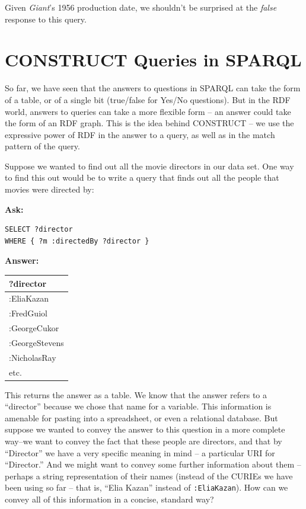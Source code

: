 Given \emph{Giant}'s 1956 production date, we shouldn't be surprised at
the \emph{false} response to this query.

\section{CONSTRUCT Queries in SPARQL}

So far, we have seen that the answers to questions in SPARQL can take
the form of a table, or of a single bit (true/false for Yes/No
questions). But in the RDF world, answers to queries can take a more
flexible form -- an answer could take the form of an RDF graph. This is
the idea behind CONSTRUCT -- we use the expressive power of RDF in the
answer to a query, as well as in the match pattern of the query.

Suppose we wanted to find out all the movie directors in our data set.
One way to find this out would be to write a query that finds out all
the people that movies were directed by:

\textbf{\textbf{Ask:}}

\begin{lstlisting}
SELECT ?director
WHERE { ?m :directedBy ?director }
\end{lstlisting}

\textbf{\textbf{Answer:}}

\begin{tabular}{|l|}
\hline
?director\\
\hline
:EliaKazan\\
:FredGuiol\\
:GeorgeCukor\\
:GeorgeStevens\\
:NicholasRay\\
etc.\\
\hline
\end{tabular}

This returns the answer as a table. We know that the answer refers to a
``director'' because we chose that name for a variable. This information
is amenable for pasting into a spreadsheet, or even a relational
database. But suppose we wanted to convey the answer to this question in
a more complete way--we want to convey the fact that these people are
directors, and that by ``Director'' we have a very specific meaning in
mind -- a particular URI for ``Director.'' And we might want to convey
some further information about them -- perhaps a string representation
of their names (instead of the CURIEs we have been using so far -- that
is, ``Elia Kazan'' instead of \texttt{:EliaKazan}). How can we convey all of this
information in a concise, standard way?

